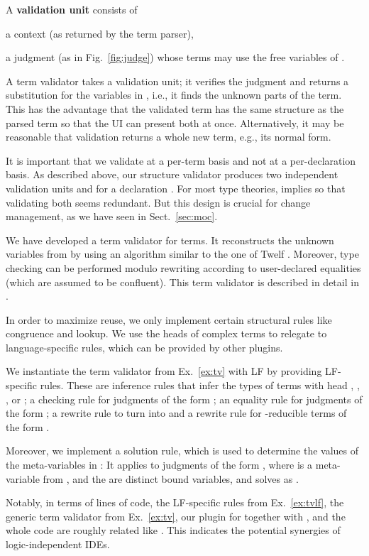 A \textbf{validation unit} consists of
\begin{inparaenum}
  \item a context  (as returned by the term parser),
  \item a judgment (as in Fig.~\ref{fig:judge}) whose terms may use the free variables of .
\end{inparaenum}

A term validator takes a validation unit; it verifies the judgment and returns a substitution for the variables in , i.e., it finds the unknown parts of the term.
This has the advantage that the validated term has the same structure as the parsed term so that the UI can present both at once.
Alternatively, it may be reasonable that validation returns a whole new term, e.g., its normal form.

It is important that we validate at a per-term basis and not at a per-declaration basis.
As described above, our structure validator produces two independent validation units  and  for a declaration .
For most type theories,  implies  so that validating both seems redundant.
But this design is crucial for change management, as we have seen in Sect.~\ref{sec:moc}.

\begin{example}\label{ex:tv}
We have developed a term validator for \mmt terms.
It reconstructs the unknown variables from  by using an algorithm similar to the one of Twelf \cite{twelf}.
Moreover, type checking can be performed modulo rewriting according to user-declared equalities (which are assumed to be confluent).
This term validator is described in detail in \cite{rabe:mmttypetheory:14}.

In order to maximize reuse, we only implement certain structural rules like congruence and lookup.
We use the heads of complex terms to relegate to language-specific rules, which can be provided by other plugins.
\end{example}

\begin{example}\label{ex:tvlf}
	We instantiate the term validator from Ex.~\ref{ex:tv} with LF by providing LF-specific rules.
	These are inference rules that infer the types of terms with head , , , or ; a checking rule for judgments of the form ; an equality rule for judgments of the form ; a rewrite rule to turn  into  and a rewrite rule for -reducible terms of the form .
	
	Moreover, we implement a solution rule, which is used to determine the values of the meta-variables in : It applies to judgments of the form , where  is a meta-variable from , and the  are distinct bound variables, and solves  as .
\end{example}

Notably, in terms of lines of code, the LF-specific rules from Ex.~\ref{ex:tvlf}, the generic term validator from Ex.~\ref{ex:tv}, our plugin for \jedit together with \mmt, and the whole \jedit code are roughly related like .
This indicates the potential synergies of logic-independent IDEs.
	